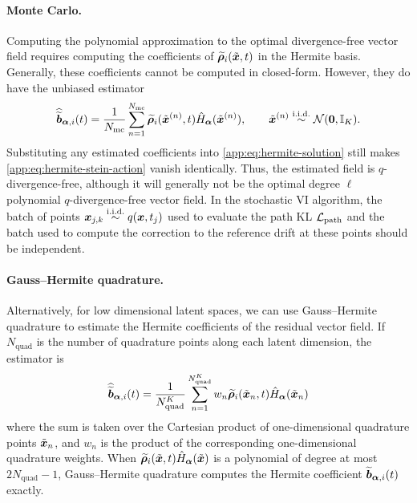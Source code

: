 \paragraph{Monte Carlo.}
Computing the polynomial approximation to the optimal divergence-free vector field requires computing the coefficients of $\widetilde{\boldsymbol{\rho}}_i(\tilde{\boldsymbol{x}}, t)$ in the Hermite basis.
Generally, these coefficients cannot be computed in closed-form.
However, they do have the unbiased estimator
\begin{equation}\label{app:eq:hermite-mc}
\widehat{\widetilde{\boldsymbol{b}}}_{\boldsymbol{\alpha},i}(t)=\frac{1}{N_{\mathrm{mc}}}\sum_{n=1}^{N_{\mathrm{mc}}}\widetilde{\boldsymbol{\rho}}_i(\tilde{\boldsymbol{x}}^{(n)},t)\hat{H}_{\boldsymbol{\alpha}}(\tilde{\boldsymbol{x}}^{(n)}), \qquad \tilde{\boldsymbol{x}}^{(n)}\overset{\mathrm{i.i.d.}}{\sim}\mathcal{N}(\boldsymbol{0},\mathbb{I}_K).
\end{equation}
Substituting any estimated coefficients into \cref{app:eq:hermite-solution} still makes \cref{app:eq:hermite-stein-action} vanish identically.
Thus, the estimated field is $q$-divergence-free, although it will generally not be the optimal degree $\ell$ polynomial $q$-divergence-free vector field.
In the stochastic VI algorithm, the batch of points $\boldsymbol{x}_{j, k} \overset{\mathrm{i.i.d.}}{\sim} q(\boldsymbol{x}, t_j)$ used to evaluate the path KL $\mathcal{L}_{\mathrm{path}}$ and the batch used to compute the correction to the reference drift at these points should be independent.

\paragraph{Gauss--Hermite quadrature.}
Alternatively, for low dimensional latent spaces, we can use Gauss--Hermite quadrature to estimate the Hermite coefficients of the residual vector field. If $N_{\mathrm{quad}}$ is the number of quadrature points along each latent dimension, the estimator is
\begin{equation}\label{app:eq:hermite-quad}
\widehat{\widetilde{\boldsymbol{b}}}_{\boldsymbol{\alpha},i}(t)=\frac{1}{N_{\mathrm{quad}}^K}\sum_{n=1}^{N_{\mathrm{quad}}^K} w_n \widetilde{\boldsymbol{\rho}}_i(\tilde{\boldsymbol{x}}_n, t)\hat{H}_{\boldsymbol{\alpha}}(\tilde{\boldsymbol{x}}_n)
\end{equation}
where the sum is taken over the Cartesian product of one-dimensional quadrature points $\tilde{\boldsymbol{x}}_n$, and $w_n$ is the product of the corresponding one-dimensional quadrature weights.
When $\widetilde{\boldsymbol{\rho}}_i(\tilde{\boldsymbol{x}}, t) \hat{H}_{\boldsymbol{\alpha}}(\tilde{\boldsymbol{x}})$ is a polynomial of degree at most $2 N_{\mathrm{quad}} - 1$, Gauss--Hermite quadrature computes the Hermite coefficient $\widetilde{\boldsymbol{b}}_{\boldsymbol{\alpha},i}(t)$ exactly.


